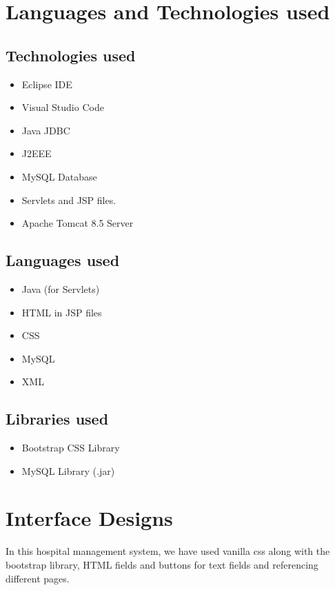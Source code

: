 \documentclass[12pt]{article}
\begin{document}
\newpage
\section{Languages and Technologies used}

\subsection{Technologies used}
\begin{itemize}
    \item Eclipse IDE
    \item Visual Studio Code
    \item Java JDBC
    \item J2EEE
    \item MySQL Database 
    \item Servlets and JSP files. 
    \item Apache Tomcat 8.5 Server
\end{itemize}

\subsection{Languages used}
\begin{itemize}
    \item Java (for Servlets)
    \item HTML in JSP files
    \item CSS
    \item MySQL
    \item XML
\end{itemize}

\subsection{Libraries used}
\begin{itemize}
    \item Bootstrap CSS Library
    \item MySQL Library (.jar)
\end{itemize}

\section{Interface Designs}

In this hospital management system, we have used vanilla css along with the bootstrap library, HTML fields and buttons for text fields and referencing different pages.
\end{document}
